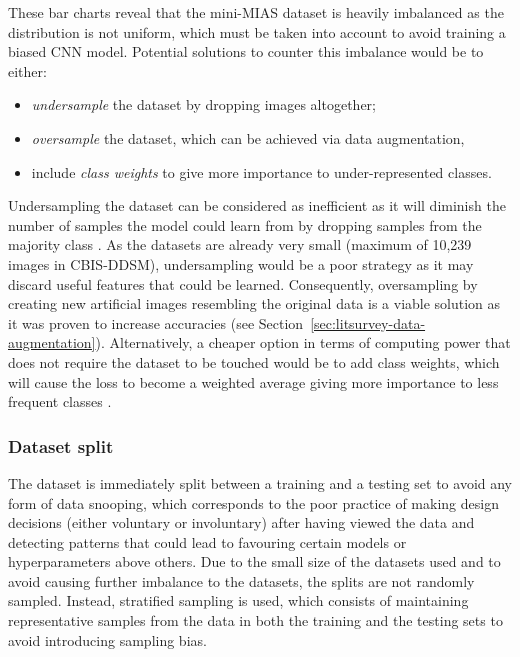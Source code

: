These bar charts reveal that the mini-MIAS dataset is heavily imbalanced as the distribution is not uniform, which must be taken into account to avoid training a biased CNN model. Potential solutions to counter this imbalance would be to either:
\begin{itemize}
    \item \textit{undersample} the dataset by dropping images altogether;
    \item \textit{oversample} the dataset, which can be achieved via data augmentation,
    \item include \textit{class weights} to give more importance to under-represented classes. 
\end{itemize}

Undersampling the dataset can be considered as inefficient as it will diminish the number of samples the model could learn from by dropping samples from the majority class \citep{Liu2009}. As the datasets are already very small (maximum of 10,239 images in CBIS-DDSM), undersampling would be a poor strategy as it may discard useful features that could be learned. Consequently, oversampling by creating new artificial images resembling the original data is a viable solution as it was proven to increase accuracies (see Section~\ref{sec:litsurvey-data-augmentation}). Alternatively, a cheaper option in terms of computing power that does not require the dataset to be touched would be to add class weights, which will cause the loss to become a weighted average giving more importance to less frequent classes \citep{Zhu2018}.

\subsubsection{Dataset split}

The dataset is immediately split between a training and a testing set to avoid any form of data snooping, which corresponds to the poor practice of making design decisions (either voluntary or involuntary) after having viewed the data and detecting patterns that could lead to favouring certain models or hyperparameters above others. Due to the small size of the datasets used and to avoid causing further imbalance to the datasets, the splits are not randomly sampled. Instead, stratified sampling is used, which consists of maintaining representative samples from the data in both the training and the testing sets to avoid introducing sampling bias.\\

